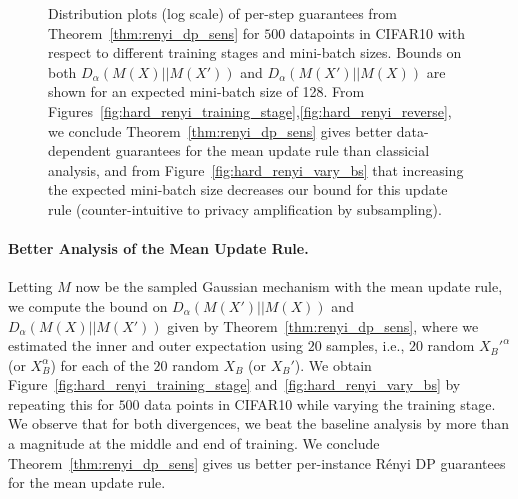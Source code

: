 \begin{figure}[!t]
\centering
{}

\caption{ Distribution plots (log scale) of per-step guarantees from Theorem~\ref{thm:renyi_dp_sens} for $500$ datapoints in CIFAR10 with respect to different training stages and mini-batch sizes. Bounds on both $D_{\alpha}(M(X)||M(X'))$ and $D_{\alpha}(M(X')||M(X))$ are shown for an expected mini-batch size of 128.  From Figures~\ref{fig:hard_renyi_training_stage},\ref{fig:hard_renyi_reverse}, we conclude Theorem~\ref{thm:renyi_dp_sens} gives better data-dependent guarantees for the mean update rule than classicial analysis, and from Figure~\ref{fig:hard_renyi_vary_bs} that increasing the expected mini-batch size decreases our bound for this update rule (counter-intuitive to privacy amplification by subsampling).
}
\label{fig:hard_renyi}
\end{figure}


\paragraph{Better Analysis of the Mean Update Rule. } Letting $M$ now be the sampled Gaussian mechanism with the mean update rule, we compute the bound on $D_{\alpha}(M(X')||M(X))$ and $D_{\alpha}(M(X)||M(X'))$ given by Theorem~\ref{thm:renyi_dp_sens}, where we estimated the inner and outer expectation using $20$ samples, i.e., $20$ random $X_B'^{\alpha}$ (or $X_B^{\alpha}$) for each of the $20$ random $X_B$ (or $X_B'$). We obtain Figure~\ref{fig:hard_renyi_training_stage} and~\ref{fig:hard_renyi_vary_bs} by repeating this for $500$ data points in CIFAR10 while varying the training stage. We observe that for both divergences, we beat the baseline analysis by more than a magnitude at the middle and end of training. We conclude Theorem~\ref{thm:renyi_dp_sens} gives us better per-instance R\'enyi DP guarantees for the mean update rule.








